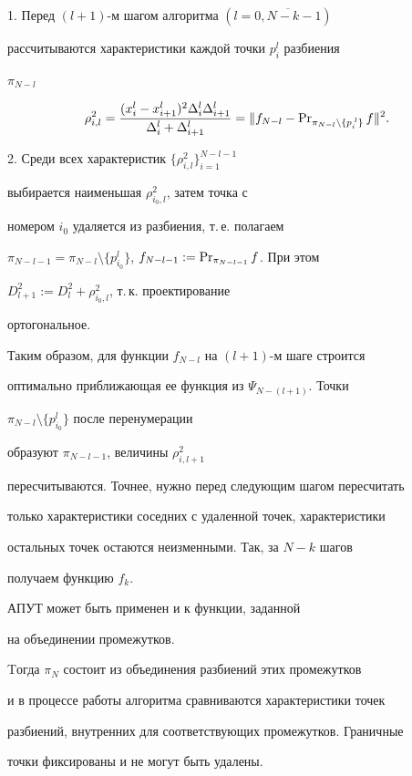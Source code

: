 1. Перед $(l+1)$-м шагом алгоритма $(l=\overline{0,N-k-1})$


рассчитываются характеристики каждой точки $p_i^{l}$ разбиения


$\pi_{N-l}$


\begin{equation}


\rho_{i,l}^2=\frac{(x_i^l-x_{i+1}^l)^2\Delta_i^l


\Delta_{i+1}^l}{\Delta_i^l+\Delta_{i+1}^l}


=\|f_{N-l}- \PR_{\pi_{N-l}\setminus \{p_i^{\;l}\}}f \|^2.


\label{R}


\end{equation}





2. Среди всех характеристик $\{\rho_{i,l}^2\}_{i=1}^{N-l-1}$


выбирается наименьшая $\rho_{i_0,l}^2$, затем точка с


номером $i_0$ удаляется из разбиения, т.\,е. полагаем


$\pi_{N-l-1}=\pi_{N-l}\setminus \{p_{i_0}^{l}\}$, $f_{N-l-1}:=


\PR_{\pi_{N-l-1}}f$. При этом


$D_{l+1}^2:=D^2_l+\rho_{i_0,l}^2$, т.\,к. проектирование


ортогональное.





Таким образом, для функции $f_{N-l}$ на $(l+1)$-м шаге строится


оптимально приближающая ее функция из $\Psi_{N-(l+1)}$. Точки


$\pi_{N-l}\setminus \{p_{i_0}^{l}\}$ после перенумерации


образуют $\pi_{N-l-1}$, величины $\rho_{i,l+1}^2$


пересчитываются. Точнее, нужно перед следующим шагом пересчитать


только характеристики соседних с удаленной точек, характеристики


остальных точек остаются неизменными. Так, за $N-k$ шагов


получаем функцию $f_{k}$.





\begin{note}


АПУТ может быть применен и к функции, заданной


на объединении промежутков.


Tогда $\pi_N$ состоит из объединения разбиений этих промежутков


и в процессе работы алгоритма сравниваются характеристики точек


разбиений, внутренних для соответствующих промежутков. Граничные


точки фиксированы и не могут быть удалены.


\end{note}





